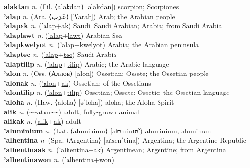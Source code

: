 \textbf{alaktan} \textit{n.} (Fil. ⟨alakdan⟩ [alakdan])
scorpion; Scorpiones \label{alaktan} \\
\textbf{'alap} \textit{n.} (Ara. ⟨عَرَب⟩ [ˈʕarab])
Arab; the Arabian people \label{'alap} \\
\textbf{'alapak} \textit{n.} (\hyperref['alap]{'alap}+\hyperref[ak]{ak})
Saudi; Saudi Arabian; Arabia; from Saudi Arabia \label{'alapak} \\
\textbf{'alaplawt} \textit{n.} (\hyperref['alap]{'alap}+\hyperref[lawt]{lawt})
Arabian Sea \label{'alaplawt} \\
\textbf{'alapkwelyot} \textit{n.} (\hyperref['alap]{'alap}+\hyperref[kwelyot]{kwelyot})
Arabia; the Arabian peninsula \label{'alapkwelyot} \\
\textbf{'alaptec} \textit{n.} (\hyperref['alap]{'alap}+\hyperref[tec]{tec})
Saudi Arabia \label{'alaptec} \\
\textbf{'alaptilip} \textit{n.} (\hyperref['alap]{'alap}+\hyperref[tilip]{tilip})
Arabic; the Arabic language \label{'alaptilip} \\
\textbf{'alon} \textit{n.} (Oss. ⟨Аллон⟩ [alon])
Ossetian; Ossete; the Ossetian people \label{'alon} \\
\textbf{'alonak} \textit{n.} (\hyperref['alon]{'alon}+\hyperref[ak]{ak})
Ossetian; of the Ossetians \label{'alonak} \\
\textbf{'alontilip} \textit{n.} (\hyperref['alon]{'alon}+\hyperref[tilip]{tilip})
Ossetian; Ossete; Ossetic; the Ossetian language \label{'alontilip} \\
\textbf{'aloha} \textit{n.} (Haw. ⟨aloha⟩ [əˈloha])
aloha; the Aloha Spirit \label{'aloha} \\
\textbf{alik} \textit{n.} (\hyperref[atun]{\~{}\~{}atun\~{}\~{}})
adult; fully-grown animal \label{alik} \\
\textbf{alikak} \textit{n.} (\hyperref[alik]{alik}+\hyperref[ak]{ak})
adult \label{alikak} \\
\textbf{'aluminium} \textit{n.} (Lat. ⟨aluminium⟩ [alʊminɪʊ̃])
aluminium; aluminum \label{'aluminium} \\
\textbf{'alhentina} \textit{n.} (Spa. ⟨Argentina⟩ [aɾxenˈtina])
Argentina; the Argentine Republic \label{'alhentina} \\
\textbf{'alhentinaak} \textit{n.} (\hyperref['alhentina]{'alhentina}+\hyperref[ak]{ak})
Argentinean; Argentine; from Argentina \label{'alhentinaak} \\
\textbf{'alhentinawon} \textit{n.} (\hyperref['alhentina]{'alhentina}+\hyperref[won]{won})
